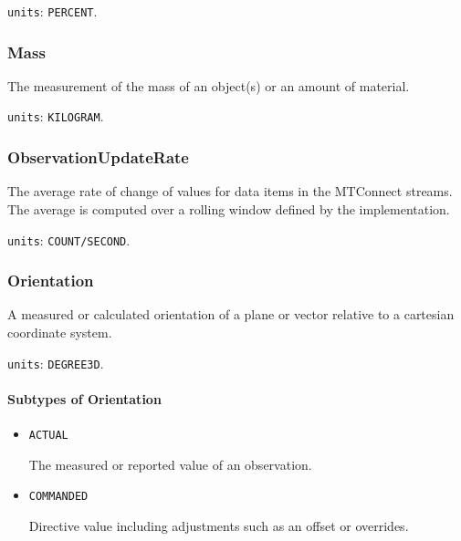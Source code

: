 \texttt{units}: \texttt{PERCENT}.


\subsubsection{Mass}
\label{sec:Mass}



The measurement of the mass of an object(s) or an amount of material.


\texttt{units}: \texttt{KILOGRAM}.


\subsubsection{ObservationUpdateRate}
\label{sec:ObservationUpdateRate}



The average rate of change of values for data items in the MTConnect streams. The average is computed over a rolling window defined by the implementation.


\texttt{units}: \texttt{COUNT/SECOND}.


\subsubsection{Orientation}
\label{sec:Orientation}



A measured or calculated orientation of a plane or vector relative to a cartesian coordinate system.


\texttt{units}: \texttt{DEGREE\textunderscore 3D}.

\paragraph{Subtypes of Orientation}\mbox{}
\label{sec:Subtypes of Orientation}

\begin{itemize}

\item \texttt{ACTUAL}


The measured or reported value of an \gls{observation}.

\item \texttt{COMMANDED}


Directive value including adjustments such as an offset or overrides.


\end{itemize}





